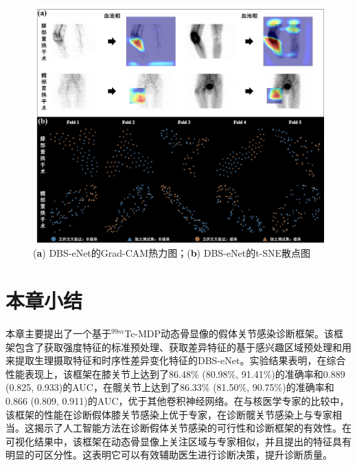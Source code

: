 \begin{figure}[htbp]
  \centering
  \includegraphics[width=\textwidth]{figures/chap03_Grad-CAM_t-SNE.jpg}
  \caption{(\textbf{a}) DBS-eNet的Grad-CAM热力图；(\textbf{b}) DBS-eNet的t-SNE散点图}
  \label{fig:chap03_Grad-CAM_t-SNE}
\end{figure}

\section{本章小结}

本章主要提出了一个基于\(^{99m}\)Tc-MDP动态骨显像的假体关节感染诊断框架。该框架包含了获取强度特征的标准预处理、获取差异特征的基于感兴趣区域预处理和用来提取生理摄取特征和时序性差异变化特征的DBS-eNet。实验结果表明，在综合性能表现上，该框架在膝关节上达到了86.48\% (80.98\%, 91.41\%)的准确率和0.889 (0.825, 0.933)的AUC，在髋关节上达到了86.33\% (81.50\%, 90.75\%)的准确率和0.866 (0.809, 0.911)的AUC，优于其他卷积神经网络。在与核医学专家的比较中，该框架的性能在诊断假体膝关节感染上优于专家，在诊断髋关节感染上与专家相当。这揭示了人工智能方法在诊断假体关节感染的可行性和诊断框架的有效性。在可视化结果中，该框架在动态骨显像上关注区域与专家相似，并且提出的特征具有明显的可区分性。这表明它可以有效辅助医生进行诊断决策，提升诊断质量。
